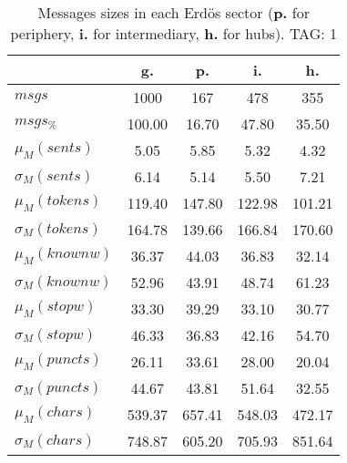 \begin{table}[h!]
\begin{center}
\begin{tabular}{| l | c | c | c | c |}\hline
 & g. & p. & i. & h. \\\hline
$msgs$ & 1000  & 167  & 478  & 355 \\\hline
$msgs_{\%}$ & 100.00  & 16.70  & 47.80  & 35.50 \\\hline
$\mu_M(sents)$ & 5.05  & 5.85  & 5.32  & 4.32 \\\hline
$\sigma_M(sents)$ & 6.14  & 5.14  & 5.50  & 7.21 \\\hline
$\mu_M(tokens)$ & 119.40  & 147.80  & 122.98  & 101.21 \\\hline
$\sigma_M(tokens)$ & 164.78  & 139.66  & 166.84  & 170.60 \\\hline
$\mu_M(knownw)$ & 36.37  & 44.03  & 36.83  & 32.14 \\\hline
$\sigma_M(knownw)$ & 52.96  & 43.91  & 48.74  & 61.23 \\\hline
$\mu_M(stopw)$ & 33.30  & 39.29  & 33.10  & 30.77 \\\hline
$\sigma_M(stopw)$ & 46.33  & 36.83  & 42.16  & 54.70 \\\hline
$\mu_M(puncts)$ & 26.11  & 33.61  & 28.00  & 20.04 \\\hline
$\sigma_M(puncts)$ & 44.67  & 43.81  & 51.64  & 32.55 \\\hline
$\mu_M(chars)$ & 539.37  & 657.41  & 548.03  & 472.17 \\\hline
$\sigma_M(chars)$ & 748.87  & 605.20  & 705.93  & 851.64 \\\hline
\end{tabular}
\caption{Messages sizes in each Erd\"os sector ({{\bf p.}} for periphery, {{\bf i.}} for intermediary, {{\bf h.}} for hubs). TAG: 1}
\end{center}
\end{table}
